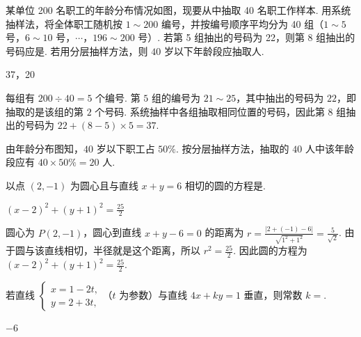 \begin{problem}
某单位 200 名职工的年龄分布情况如图，现要从中抽取 40 名职工作样本.
用系统抽样法，将全体职工随机按 \(1 \sim 200\) 编号，并按编号顺序平均分为 40 组（\(1 \sim 5\) 号，\(6 \sim 10\) 号，\(\cdots\)，\(196 \sim 200\) 号）. 若第 5 组抽出的号码为 22，则第 8 组抽出的号码应是\fillinblank{}. 若用分层抽样方法，则 \(40\text{ 岁}\)以下年龄段应抽取\fillinblank{}人.
\end{problem}

\begin{answer}
37，20
\end{answer}

\begin{solution}
每组有 \(200\div40=5\) 个编号. 第 \(5\) 组的编号为 \(21\sim25\)，其中抽出的号码为 \(22\)，即抽取的是该组的第 \(2\) 个号码. 系统抽样中各组抽取相同位置的号码，因此第 \(8\) 组抽出的号码为
\(22+(8-5)\times5=37\).

由年龄分布图知，\(40\text{ 岁}\)以下职工占 \(50\%\). 按分层抽样方法，抽取的 \(40\) 人中该年龄段应有
\(40\times50\%=20\) 人.
\end{solution}

\begin{problem}
以点 \((2,-1)\) 为圆心且与直线 \(x + y = 6\) 相切的圆的方程是\fillinblank{}.
\end{problem}

\begin{answer}
\((x-2)^2+(y+1)^2=\frac{25}{2}\)
\end{answer}

\begin{solution}
圆心为 \(P(2,-1)\)，圆心到直线 \(x+y-6=0\) 的距离为
\(r=\frac{|2+(-1)-6|}{\sqrt{1^2+1^2}}=\frac{5}{\sqrt2}\).
由于圆与该直线相切，半径就是这个距离，所以 \(r^2=\frac{25}{2}\). 因此圆的方程为
\((x-2)^2+(y+1)^2=\frac{25}{2}\).
\end{solution}

\begin{problem}
若直线 \(\begin{cases}
x = 1 - 2t,\\
y = 2 + 3t,
\end{cases}\)（\(t\) 为参数）与直线 \(4x + ky = 1\) 垂直，则常数 \(k =\)\fillinblank{}.

\end{problem}

\begin{answer}
\(-6\)
\end{answer}

